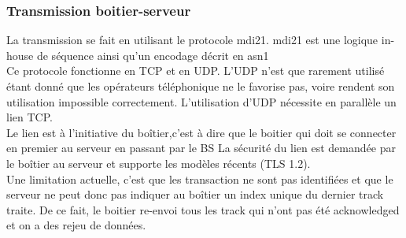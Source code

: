         \subsubsection{Transmission boitier-serveur }
        La transmission se fait en utilisant le protocole \gls{mdi21}. \gls{mdi21} est une logique in-house de séquence 
        ainsi qu’un encodage décrit en \gls{asn1}\\
        Ce protocole fonctionne en TCP et en UDP. L’UDP n’est que rarement utilisé étant 
        donné que les opérateurs téléphonique ne le favorise pas, voire rendent son utilisation impossible correctement.
        L’utilisation d’UDP nécessite en parallèle un lien TCP.\\
        Le lien est à l’initiative du boîtier,c'est à dire que le boitier qui doit se connecter en premier au serveur en passant par le \gls{BS}
        La sécurité du lien est demandée par le boîtier au serveur et supporte les modèles récents (TLS 1.2).\\
        Une limitation actuelle, c’est que les transaction ne sont pas identifiées et que le serveur ne peut donc pas indiquer 
        au boîtier un index unique du dernier track traite. De ce fait, le boitier re-envoi tous les track qui n’ont pas été 
        acknowledged et on a des rejeu de données.
